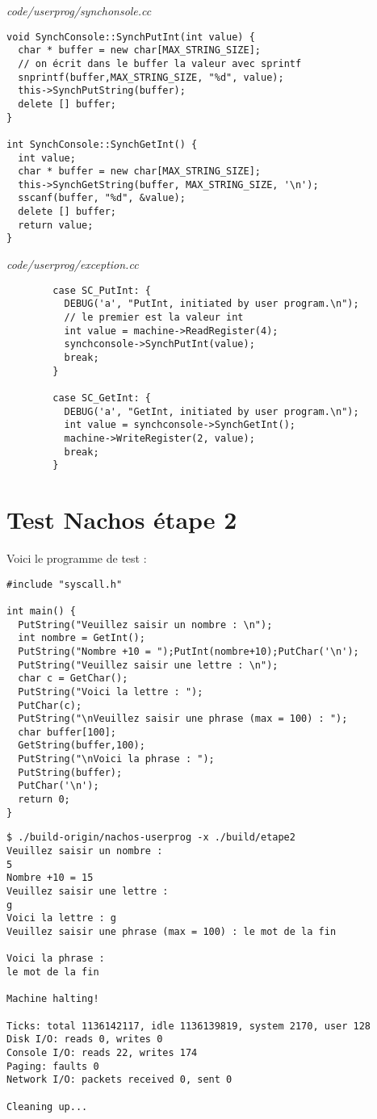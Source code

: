 \documentclass[a4paper,10pt]{article}
\begin{document}
\textit{code/userprog/synchonsole.cc}
\begin{lstlisting}
void SynchConsole::SynchPutInt(int value) {
  char * buffer = new char[MAX_STRING_SIZE];
  // on écrit dans le buffer la valeur avec sprintf
  snprintf(buffer,MAX_STRING_SIZE, "%d", value);
  this->SynchPutString(buffer);
  delete [] buffer;
}

int SynchConsole::SynchGetInt() {
  int value;
  char * buffer = new char[MAX_STRING_SIZE];
  this->SynchGetString(buffer, MAX_STRING_SIZE, '\n');
  sscanf(buffer, "%d", &value);
  delete [] buffer;
  return value;
}
\end{lstlisting}

\textit{code/userprog/exception.cc}
\begin{lstlisting}
        case SC_PutInt: {
          DEBUG('a', "PutInt, initiated by user program.\n");
          // le premier est la valeur int
          int value = machine->ReadRegister(4);
          synchconsole->SynchPutInt(value);
          break;
        }

        case SC_GetInt: {
          DEBUG('a', "GetInt, initiated by user program.\n");
          int value = synchconsole->SynchGetInt();
          machine->WriteRegister(2, value);
          break;
        }
\end{lstlisting}

\newpage

\section{Test Nachos étape 2}

Voici le programme de test :

\begin{lstlisting}
#include "syscall.h"

int main() {
  PutString("Veuillez saisir un nombre : \n");
  int nombre = GetInt();
  PutString("Nombre +10 = ");PutInt(nombre+10);PutChar('\n');
  PutString("Veuillez saisir une lettre : \n");
  char c = GetChar();
  PutString("Voici la lettre : ");
  PutChar(c);
  PutString("\nVeuillez saisir une phrase (max = 100) : ");
  char buffer[100];
  GetString(buffer,100);
  PutString("\nVoici la phrase : ");
  PutString(buffer);
  PutChar('\n');
  return 0;
}
\end{lstlisting}

\begin{lstlisting}
$ ./build-origin/nachos-userprog -x ./build/etape2
Veuillez saisir un nombre :
5
Nombre +10 = 15
Veuillez saisir une lettre :
g
Voici la lettre : g
Veuillez saisir une phrase (max = 100) : le mot de la fin

Voici la phrase :
le mot de la fin

Machine halting!

Ticks: total 1136142117, idle 1136139819, system 2170, user 128
Disk I/O: reads 0, writes 0
Console I/O: reads 22, writes 174
Paging: faults 0
Network I/O: packets received 0, sent 0

Cleaning up...
\end{lstlisting}
\end{document}

